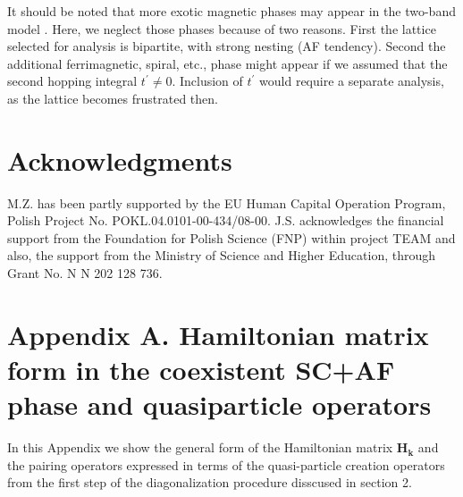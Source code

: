 \documentclass[aps,prb,showpacs,reprint]{revtex4-1}
\begin{document}
It should be noted that more exotic magnetic phases may appear in the two-band model \cite{Inagaki1973}. Here, we neglect those phases because of two reasons. First the lattice selected for analysis is bipartite, with strong nesting (AF tendency). Second the additional ferrimagnetic, spiral, etc., phase might appear if we assumed that the second hopping integral $t^{\prime}\neq 0$. Inclusion of $t^{\prime}$ would require a separate analysis, as the lattice becomes frustrated then.



\section{Acknowledgments}\label{sec:ack}
M.Z. has been partly supported by the EU Human Capital Operation Program, Polish
Project No. POKL.04.0101-00-434/08-00. J.S. acknowledges the financial support
from the Foundation for Polish Science (FNP) within project TEAM and
also, the support from the Ministry of Science and Higher Education, through
Grant No. N N 202 128 736.



\section*{Appendix A. Hamiltonian matrix form in the
coexistent SC+AF phase and quasiparticle operators}
In this Appendix we show the general form of the Hamiltonian matrix
$\mathbf{H}_{\mathbf{k}}$ and the pairing operators expressed in terms of the
quasi-particle creation operators from the first step of the diagonalization
procedure disscused in section 2.
\end{document}
